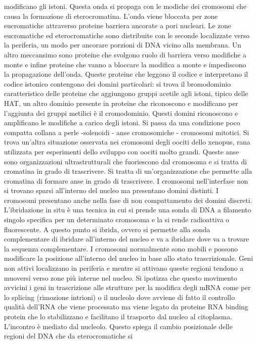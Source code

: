 modificano gli istoni. Questa onda si propaga con le modiche dei cromosomi che causa la formazione di eterocromatina. L'onda viene bloccata per zone eucromatiche attraverso proteine 
barriera ancorate a pori nucleari. Le zone eucromatiche ed eterocromatiche sono distribuite con le seconde localizzate verso la periferia, un modo per ancorare porzioni di DNA vicino
alla membrana. Un altro meccansimo sono proteine che svolgono ruolo di barriera verso modifiche a monte e infine proteine che vanno a bloccare la modifica a monte e impediscono la 
propagazione dell'onda. Queste proteine che leggono il codice e interpretano il codice istonico contengono dei domini particolari: si trova il bromodominio caratteristico delle proteine
che aggiungono gruppi acetile agli istoni, tipico delle HAT, un altro dominio presente in proteine che riconoscono e modificano per l'aggiunta dei gruppi metilici \`e il cromodominio. 
Questi domini riconoscono e amplificano le modifiche a carico degli istoni. Si passa da una condizione poco compatta collana a perle -solenoidi - anse cromosomiche - cromosomi mitotici. 
Si trova un'altra situazione osservata nei cromosomi degli oociti dello xenopus, rana utilizzata per esperimenti dello sviluppo con oociti molto grandi. Queste anse sono organizzazioni
ultrastrutturali che fuoriescono dal cromosoma e si tratta di cromatina in grado di trascrivere. Si tratta di un'organizzazione che permette alla cromatina di formare anse in grado di
trascrivere. I cromosomi nell'interfase non si trovano sparsi all'interno del nucleo ma presentano domini distinti. I cromosomi presentano anche nella fase di non compattamento dei 
domini discreti. L'ibridazione in situ \`e una tecnica in cui si prende una sonda di DNA a filamento singolo specifica per un determinato cromosoma e la si rende radioattiva o 
fluorescente. A questo punto si ibrida, ovvero si permette alla sonda complementare di ibridare all'interno del nucleo e va a ibridare dove va a trovare la sequenza complementare. I 
cromosomi normalmente sono mobili e possono modificare la posizione all'interno del nucleo in base allo stato trascrizionale. Geni non attivi localizzano in periferia e mentre si attivano
queste regioni tendono a muoversi verso zone pi\`u interne nel nucleo. Si ipotizza che questo movimento avvicini i geni in trascrizione alle strutture per la modifica degli mRNA come 
per lo splicing (rimozione intrioni) o il nucleolo dove avviene di fatto il controllo qualit\`a dell'RNA che viene processato ma viene legato da proteine RNA binding protein che lo 
stabilizzano e facilitano il trasporto dal nucleo al citoplasma. L'incontro \`e mediato dal nucleolo. Questo spiega il cambio posizionale delle regioni del DNA che da eterocromatiche si
